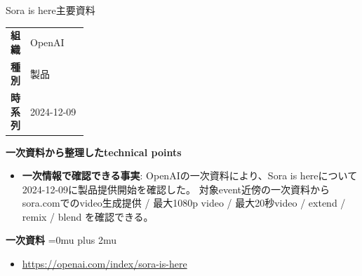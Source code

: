 \begin{technicalnote}{Sora is here}{主要資料}
\begingroup
\begin{tabularx}{\linewidth}{@{}>{\bfseries}p{0.22\linewidth}X@{}}
組織 & OpenAI \\
種別 & 製品 \\
時系列 & 2024-12-09 \\
\end{tabularx}
\smallskip
{\bfseries 一次資料から整理したtechnical points}
\begin{itemize}[leftmargin=1.5em,itemsep=0.35em]
\item \textbf{一次情報で確認できる事実}: OpenAIの一次資料により、Sora is hereについて2024-12-09に製品提供開始を確認した。 対象event近傍の一次資料から sora.comでのvideo生成提供 / 最大1080p video / 最大20秒video / extend / remix / blend を確認できる。
\end{itemize}
\begin{minipage}{\linewidth}
\begin{samepage}
{\bfseries 一次資料}
\begingroup\sloppy
\Urlmuskip=0mu plus 2mu\relax
\begin{itemize}[leftmargin=1.5em,itemsep=0.25em]
\item {\scriptsize\url{https://openai.com/index/sora-is-here}}
\end{itemize}
\endgroup
\end{samepage}
\end{minipage}
\endgroup
\end{technicalnote}
\medskip

